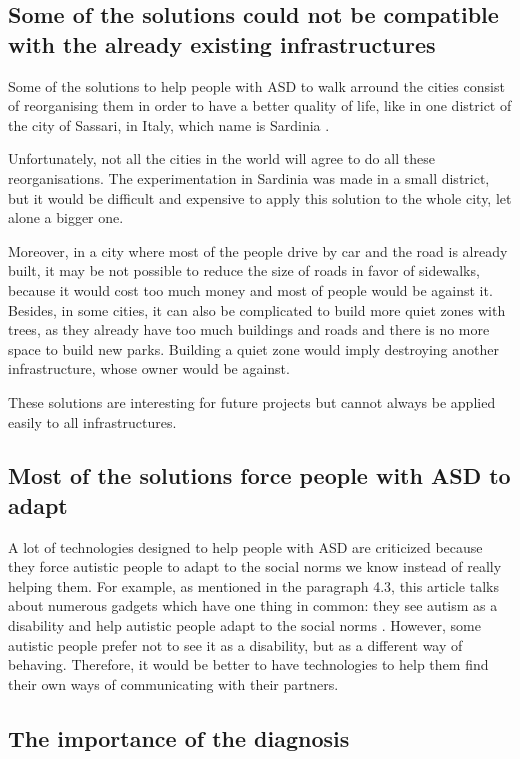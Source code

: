 \subsection{Some of the solutions could not be compatible with the already existing infrastructures}
Some of the solutions to help people with ASD to walk arround the cities consist of reorganising them in order to have a better quality of life, like in one district of the city of Sassari, in Italy, which name is Sardinia \cite{2018MobilityPoliciesExtraSmall}.

Unfortunately, not all the cities in the world will agree to do all these reorganisations. The experimentation in Sardinia was made in a small district, but it would be difficult and expensive to apply this solution to the whole city, let alone a bigger one.

Moreover, in a city where most of the people drive by car and the road is already built, it may be not possible to reduce the size of roads in favor of sidewalks, because it would cost too much money and most of people would be against it. Besides, in some cities, it can also be complicated to build more quiet zones with trees, as they already have too much buildings and roads and there is no more space to build new parks. Building a quiet zone would imply destroying another infrastructure, whose owner would be against. 

These solutions are interesting for future projects but cannot always be applied easily to all infrastructures.

\subsection{Most of the solutions force people with ASD to adapt}

A lot of technologies designed to help people with ASD are criticized because they force autistic people to adapt to the social norms we know instead of really helping them. For example, as mentioned in the paragraph 4.3, this article talks about numerous gadgets which have one thing in common: they see autism as a disability and help autistic people adapt to the social norms \cite{2017UTravelSmartMobility}. However, some autistic people prefer not to see it as a disability, but as a different way of behaving. Therefore, it would be better to have technologies to help them find their own ways of communicating with their partners. 

\subsection{The importance of the diagnosis}

